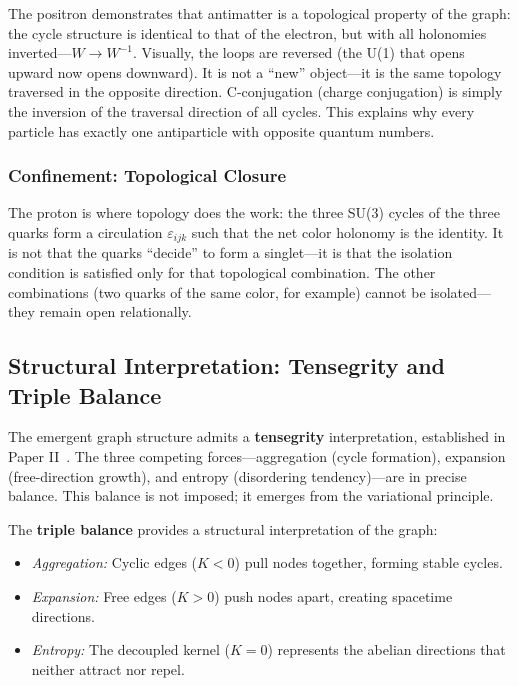 The positron demonstrates that antimatter is a topological property of the graph: the cycle structure is identical to that of the electron, but with all holonomies inverted---$W \to W^{-1}$. Visually, the loops are reversed (the U(1) that opens upward now opens downward). It is not a ``new'' object---it is the same topology traversed in the opposite direction. C-conjugation (charge conjugation) is simply the inversion of the traversal direction of all cycles. This explains why every particle has exactly one antiparticle with opposite quantum numbers.

\subsubsection{Confinement: Topological Closure}

The proton is where topology does the work: the three SU(3) cycles of the three quarks form a circulation $\varepsilon_{ijk}$ such that the net color holonomy is the identity. It is not that the quarks ``decide'' to form a singlet---it is that the isolation condition is satisfied only for that topological combination. The other combinations (two quarks of the same color, for example) cannot be isolated---they remain open relationally.

\subsection{Structural Interpretation: Tensegrity and Triple Balance}\label{sec:tensegrity}

The emergent graph structure admits a \textbf{tensegrity} interpretation, established in Paper II~\cite{paper2_graph_topology}. The three competing forces---aggregation (cycle formation), expansion (free-direction growth), and entropy (disordering tendency)—are in precise balance. This balance is not imposed; it emerges from the variational principle.

The \textbf{triple balance} provides a structural interpretation of the graph:
\begin{itemize}
\item \textit{Aggregation:} Cyclic edges ($K < 0$) pull nodes together, forming stable cycles.
\item \textit{Expansion:} Free edges ($K > 0$) push nodes apart, creating spacetime directions.
\item \textit{Entropy:} The decoupled kernel ($K = 0$) represents the abelian directions that neither attract nor repel.
\end{itemize}

